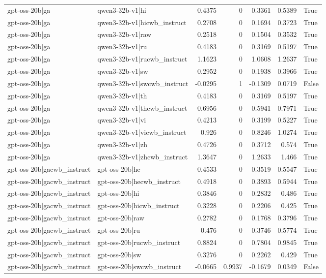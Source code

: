 \begin{table}
\begin{tabular}{l l r r r r l}
gpt-oss-20b|ga & qwen3-32b-v1|hi & 0.4375 & 0 & 0.3361 & 0.5389 & True \\
gpt-oss-20b|ga & qwen3-32b-v1|hicwb_instruct & 0.2708 & 0 & 0.1694 & 0.3723 & True \\
gpt-oss-20b|ga & qwen3-32b-v1|raw & 0.2518 & 0 & 0.1504 & 0.3532 & True \\
gpt-oss-20b|ga & qwen3-32b-v1|ru & 0.4183 & 0 & 0.3169 & 0.5197 & True \\
gpt-oss-20b|ga & qwen3-32b-v1|rucwb_instruct & 1.1623 & 0 & 1.0608 & 1.2637 & True \\
gpt-oss-20b|ga & qwen3-32b-v1|sw & 0.2952 & 0 & 0.1938 & 0.3966 & True \\
gpt-oss-20b|ga & qwen3-32b-v1|swcwb_instruct & -0.0295 & 1 & -0.1309 & 0.0719 & False \\
gpt-oss-20b|ga & qwen3-32b-v1|th & 0.4183 & 0 & 0.3169 & 0.5197 & True \\
gpt-oss-20b|ga & qwen3-32b-v1|thcwb_instruct & 0.6956 & 0 & 0.5941 & 0.7971 & True \\
gpt-oss-20b|ga & qwen3-32b-v1|vi & 0.4213 & 0 & 0.3199 & 0.5227 & True \\
gpt-oss-20b|ga & qwen3-32b-v1|vicwb_instruct & 0.926 & 0 & 0.8246 & 1.0274 & True \\
gpt-oss-20b|ga & qwen3-32b-v1|zh & 0.4726 & 0 & 0.3712 & 0.574 & True \\
gpt-oss-20b|ga & qwen3-32b-v1|zhcwb_instruct & 1.3647 & 0 & 1.2633 & 1.466 & True \\
gpt-oss-20b|gacwb_instruct & gpt-oss-20b|he & 0.4533 & 0 & 0.3519 & 0.5547 & True \\
gpt-oss-20b|gacwb_instruct & gpt-oss-20b|hecwb_instruct & 0.4918 & 0 & 0.3893 & 0.5944 & True \\
gpt-oss-20b|gacwb_instruct & gpt-oss-20b|hi & 0.3846 & 0 & 0.2832 & 0.486 & True \\
gpt-oss-20b|gacwb_instruct & gpt-oss-20b|hicwb_instruct & 0.3228 & 0 & 0.2206 & 0.425 & True \\
gpt-oss-20b|gacwb_instruct & gpt-oss-20b|raw & 0.2782 & 0 & 0.1768 & 0.3796 & True \\
gpt-oss-20b|gacwb_instruct & gpt-oss-20b|ru & 0.476 & 0 & 0.3746 & 0.5774 & True \\
gpt-oss-20b|gacwb_instruct & gpt-oss-20b|rucwb_instruct & 0.8824 & 0 & 0.7804 & 0.9845 & True \\
gpt-oss-20b|gacwb_instruct & gpt-oss-20b|sw & 0.3276 & 0 & 0.2262 & 0.429 & True \\
gpt-oss-20b|gacwb_instruct & gpt-oss-20b|swcwb_instruct & -0.0665 & 0.9937 & -0.1679 & 0.0349 & False \\

\end{tabular}
\end{table}
